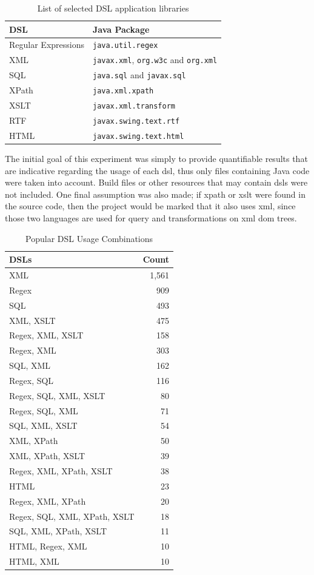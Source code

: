 \documentclass{sig-alternate}
\begin{document}
\begin{table}
\centering
\caption{List of selected DSL application libraries}
\label{tbl:dsl-list}
\begin{tabular}{l l}
 \hline
\textbf{DSL} & \textbf{Java Package}\\
\hline
Regular Expressions & \verb|java.util.regex|\\
XML & \verb|javax.xml|, \verb|org.w3c| and \verb|org.xml|\\
SQL & \verb|java.sql| and \verb|javax.sql|\\
XPath & \verb|java.xml.xpath|\\
XSLT & \verb|javax.xml.transform|\\
RTF & \verb|javax.swing.text.rtf|\\
HTML & \verb|javax.swing.text.html|\\
\hline
\end{tabular}
\end{table}

The initial goal of this experiment was simply to provide quantifiable results that are indicative regarding the usage of each {\sc dsl}, thus only files containing Java code were taken into account. Build files or other resources that may contain {\sc dsl}s were not included. One final assumption was also made; if {\sc xpath} or {\sc xslt} were found in the source code, then the project would be marked that it also uses {\sc xml}, since those two languages are used for query and transformations on {\sc xml} {\sc dom} trees.

\begin{table}
\centering
\caption{Popular DSL Usage Combinations}
\label{tbl:dsl-top-usage}
\begin{tabular}{l r}
 \hline
\textbf{DSLs} & \textbf{Count}\\
\hline
XML & 1,561\\
Regex & 909\\
SQL & 493\\
XML, XSLT & 475\\
Regex, XML, XSLT & 158\\
Regex, XML & 303\\
SQL, XML & 162\\
Regex, SQL & 116\\
Regex, SQL, XML, XSLT & 80\\
Regex, SQL, XML & 71\\
SQL, XML, XSLT & 54\\
XML, XPath & 50\\
XML, XPath, XSLT & 39\\
Regex, XML, XPath, XSLT & 38\\
HTML & 23\\
Regex, XML, XPath & 20\\
Regex, SQL, XML, XPath, XSLT & 18\\
SQL, XML, XPath, XSLT & 11\\
HTML, Regex, XML & 10\\
HTML, XML & 10\\
\hline
\end{tabular}
\end{table}
\end{document}
